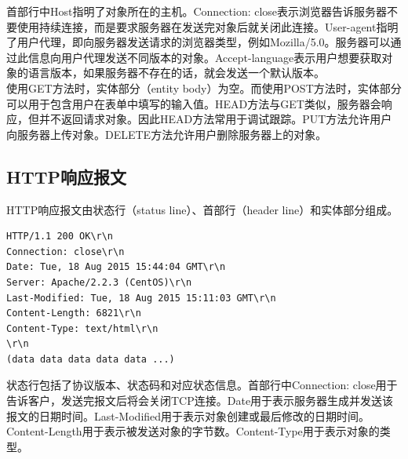 首部行中Host指明了对象所在的主机。Connection: close表示浏览器告诉服务器不要使用持续连接，而是要求服务器在发送完对象后就关闭此连接。User-agent指明了用户代理，即向服务器发送请求的浏览器类型，例如Mozilla/5.0。服务器可以通过此信息向用户代理发送不同版本的对象。Accept-language表示用户想要获取对象的语言版本，如果服务器不存在的话，就会发送一个默认版本。\\

使用GET方法时，实体部分（entity body）为空。而使用POST方法时，实体部分可以用于包含用户在表单中填写的输入值。HEAD方法与GET类似，服务器会响应，但并不返回请求对象。因此HEAD方法常用于调试跟踪。PUT方法允许用户向服务器上传对象。DELETE方法允许用户删除服务器上的对象。\\

\subsection{HTTP响应报文}

HTTP响应报文由状态行（status line）、首部行（header line）和实体部分组成。\\


\begin{lstlisting}
HTTP/1.1 200 OK\r\n
Connection: close\r\n
Date: Tue, 18 Aug 2015 15:44:04 GMT\r\n
Server: Apache/2.2.3 (CentOS)\r\n
Last-Modified: Tue, 18 Aug 2015 15:11:03 GMT\r\n
Content-Length: 6821\r\n
Content-Type: text/html\r\n
\r\n
(data data data data data ...)
\end{lstlisting}

状态行包括了协议版本、状态码和对应状态信息。首部行中Connection: close用于告诉客户，发送完报文后将会关闭TCP连接。Date用于表示服务器生成并发送该报文的日期时间。Last-Modified用于表示对象创建或最后修改的日期时间。Content-Length用于表示被发送对象的字节数。Content-Type用于表示对象的类型。\\

